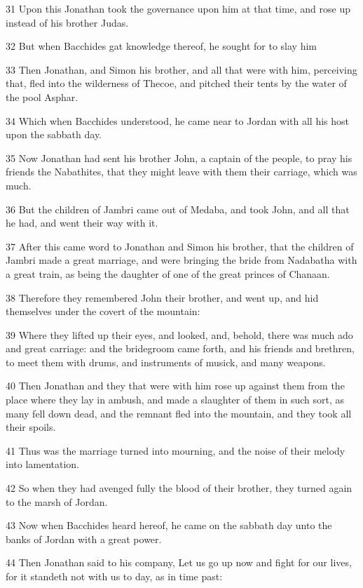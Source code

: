 \par 31 Upon this Jonathan took the governance upon him at that time, and rose up instead of his brother Judas.
\par 32 But when Bacchides gat knowledge thereof, he sought for to slay him
\par 33 Then Jonathan, and Simon his brother, and all that were with him, perceiving that, fled into the wilderness of Thecoe, and pitched their tents by the water of the pool Asphar.
\par 34 Which when Bacchides understood, he came near to Jordan with all his host upon the sabbath day.
\par 35 Now Jonathan had sent his brother John, a captain of the people, to pray his friends the Nabathites, that they might leave with them their carriage, which was much.
\par 36 But the children of Jambri came out of Medaba, and took John, and all that he had, and went their way with it.
\par 37 After this came word to Jonathan and Simon his brother, that the children of Jambri made a great marriage, and were bringing the bride from Nadabatha with a great train, as being the daughter of one of the great princes of Chanaan.
\par 38 Therefore they remembered John their brother, and went up, and hid themselves under the covert of the mountain:
\par 39 Where they lifted up their eyes, and looked, and, behold, there was much ado and great carriage: and the bridegroom came forth, and his friends and brethren, to meet them with drums, and instruments of musick, and many weapons.
\par 40 Then Jonathan and they that were with him rose up against them from the place where they lay in ambush, and made a slaughter of them in such sort, as many fell down dead, and the remnant fled into the mountain, and they took all their spoils.
\par 41 Thus was the marriage turned into mourning, and the noise of their melody into lamentation.
\par 42 So when they had avenged fully the blood of their brother, they turned again to the marsh of Jordan.
\par 43 Now when Bacchides heard hereof, he came on the sabbath day unto the banks of Jordan with a great power.
\par 44 Then Jonathan said to his company, Let us go up now and fight for our lives, for it standeth not with us to day, as in time past:
